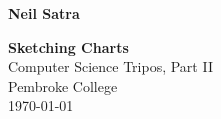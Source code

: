 \begin{titlepage}

\hfill{\LARGE \bf Neil Satra}

\vspace*{\fill}

\begin{center}
\begin{doublespacing}


\Huge {\bf Sketching Charts} \\
Computer Science Tripos, Part II \\
Pembroke College \\
\today

\end{doublespacing}
\end{center}

\vspace*{\fill}
\end{titlepage}